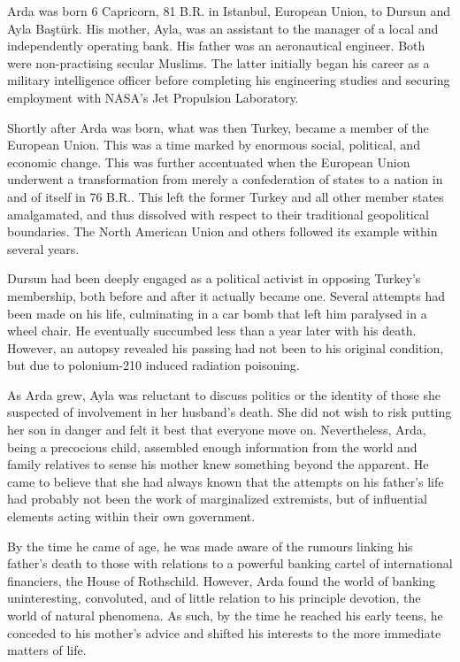 
Arda was born 6 Capricorn, 81 B.R. in Istanbul, European Union, to Dursun and Ayla Baştürk. His mother, Ayla, was an assistant to the manager of a local and independently operating bank. His father was an aeronautical engineer. Both were non-practising secular Muslims. The latter initially began his career as a military intelligence officer before completing his engineering studies and securing employment with NASA's Jet Propulsion Laboratory. 

Shortly after Arda was born, what was then Turkey, became a member of the European Union. This was a time marked by enormous social, political, and economic change. This was further accentuated when the European Union underwent a transformation from merely a confederation of states to a nation in and of itself in 76 B.R.. This left the former Turkey and all other member states amalgamated, and thus dissolved with respect to their traditional geopolitical boundaries. The North American Union and others followed its example within several years.

Dursun had been deeply engaged as a political activist in opposing Turkey's membership, both before and after it actually became one. Several attempts had been made on his life, culminating in a car bomb that left him paralysed in a wheel chair. He eventually succumbed less than a year later with his death. However, an autopsy revealed his passing had not been to his original condition, but due to polonium-210 induced radiation poisoning.

As Arda grew, Ayla was reluctant to discuss politics or the identity of those she suspected of involvement in her husband's death. She did not wish to risk putting her son in danger and felt it best that everyone move on. Nevertheless, Arda, being a precocious child, assembled enough information from the world and family relatives to sense his mother knew something beyond the apparent. He came to believe that she had always known that the attempts on his father's life had probably not been the work of marginalized extremists, but of influential elements acting within their own government.

By the time he came of age, he was made aware of the rumours linking his father's death to those with relations to a powerful banking cartel of international financiers, the House of Rothschild. However, Arda found the world of banking uninteresting, convoluted, and of little relation to his principle devotion, the world of natural phenomena. As such, by the time he reached his early teens, he conceded to his mother's advice and shifted his interests to the more immediate matters of life.

